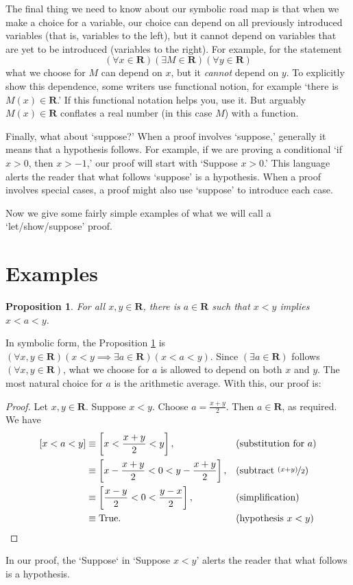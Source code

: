 \documentclass[12pt,fleqn,answers]{article}
\newcommand{\reals}{\mathbf{R}}
\newcommand{\true}{\mathrm{True}}
\newenvironment{myproof}
  {\begin{shaded}\begin{proof}}
  {\end{proof}\end{shaded}}
\newtheorem{prop}{Proposition}
\begin{document}
The final thing we need to know about our symbolic road map is that when we 
make a choice for a variable, our choice can depend on all previously
introduced variables (that is, variables to the left), but it cannot 
depend on variables that are yet to be introduced (variables to the right). 
For example, 
for the statement
\begin{equation*}
   \left(\forall x \in \reals\right)
   \left(\exists M \in \reals\right)
   \left(\forall y \in \reals \right)
 \end{equation*}
 what we choose for $M$ can depend on $x$, but it \emph{cannot}  depend on $y$. To explicitly show this dependence, some writers
 use functional notion, for example `there is $M(x) \in \reals$.'  If this functional notation helps you, use it. But arguably  
 $M(x) \in \reals$ conflates a real number (in this case $M$) with a function.

Finally, what about `suppose?' When a proof involves `suppose,' generally it means that a hypothesis follows. For example, if
we are proving a conditional `if $x > 0$, then $x > -1$,' our proof will start with `Suppose $x > 0$.' This language alerts the
reader that what follows `suppose' is a hypothesis.  When a proof involves special cases, a proof might also use `suppose' to 
introduce each case.

Now we give some fairly simple examples of what we will call a `let/show/suppose' proof.

\section{Examples}

\begin{prop}
  For all $x,y \in \reals$, there is $a \in \reals$ such that
    $x < y$ implies $x<a<y$. \label{p1}   
\end{prop}
\noindent In symbolic form, the Proposition \ref{p1} is
$\left(\forall x,y \in \reals \right) 
\left(  x < y \implies \exists a \in \reals \right)
\left(x < a < y \right)$.  Since $\left(\exists a \in \reals \right)$ follows 
$\left(\forall x,y \in \reals \right)$, what we choose for $a$ is allowed to 
depend on both $x$ and $y$. The most natural choice for $a$ is the
arithmetic average.  With this, our proof is:
\begin{myproof}
    Let $x,y \in \reals$. Suppose $x < y$. Choose $a = \frac{x+y}{2}$.
    Then $a \in \reals$, as required. We have
    \begin{align*}
      \left[ x < a < y \right] 
          &\equiv \left[ x < \frac{x+y}{2} < y \right], &&\text{(substitution for $a$)} \\
          & \equiv \left[ x - \frac{x+y}{2} < 0 < y - \frac{x+y}{2}  \right], &&\text{(subtract $\nicefrac{(x+y)}{2}$)} \\
          & \equiv \left[ \frac{x-y}{2} < 0 < \frac{y-x}{2}  \right], &&\text{(simplification)} \\
          & \equiv \true. && \text{(hypothesis $x < y$)} \qedhere
    \end{align*} 
\end{myproof}
\noindent In our proof, the `Suppose` in  `Suppose $x < y$' alerts the reader that what follows is a hypothesis.
\end{document}
